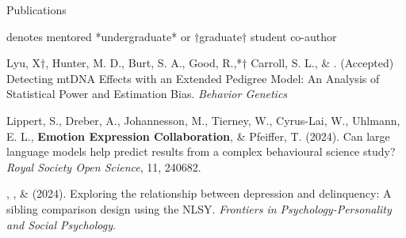 \begin{rSection}{\textrm{Publications}}%
\vspace{-1mm}\begin{center}\footnotesize{denotes mentored *undergraduate* or $\dagger$graduate$\dagger$ student co-author}\end{center}\vspace{-1mm}
\begin{etaremune}

\item Lyu, X$\dagger$, Hunter, M. D., Burt, S. A., Good, R.,*$\dagger$ Carroll, S. L., \& \meb. (Accepted) Detecting mtDNA Effects with an Extended Pedigree Model: An Analysis of Statistical Power and Estimation Bias. \href{https://www.biorxiv.org/content/10.1101/2024.12.19.629449v1}{\small\color{blue}{biorxiv.org/content/10.1101/2024.12.19.629449v1}} 
\textit{Behavior Genetics}

\item Lippert, S., Dreber, A., Johannesson, M., Tierney, W., Cyrus-Lai, W., Uhlmann, E. L., \textbf{Emotion Expression Collaboration}, \& Pfeiffer, T. (2024). Can large language models help predict results from a complex behavioural science study? \textit{Royal Society Open Science}, 11, 240682. 

\item \emsims, \jt, \& \meb (2024). Exploring the relationship between depression and delinquency: A sibling comparison design using the NLSY.  \textit{Frontiers in Psychology-Personality and Social Psychology}. 


\end{etaremune}
\end{rSection}
